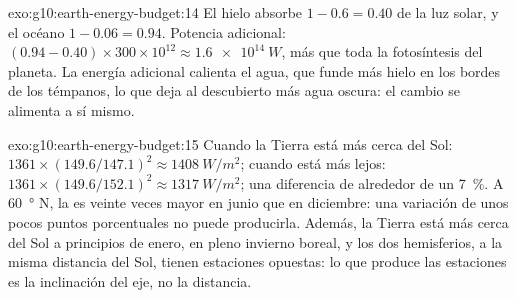 \begin{solution}{exo:g10:earth-energy-budget:14}
El hielo absorbe $1 - 0.6 = 0.40$ de la luz solar, y el océano $1 - 0.06 =
0.94$. Potencia adicional: $(0.94 - 0.40) \times 300 \times 10^{12} \approx
\qty{1.6e14}{W}$, más que toda la fotosíntesis del planeta. La energía
adicional calienta el agua, que funde más hielo en los bordes de los
témpanos, lo que deja al descubierto más agua oscura: el cambio se alimenta
a sí mismo.
\end{solution}

\begin{solution}{exo:g10:earth-energy-budget:15}
Cuando la Tierra está más cerca del Sol: $1361 \times (149.6/147.1)^2 \approx \qty{1408}{W/m^2}$; cuando está más lejos: $1361 \times (149.6/152.1)^2 \approx \qty{1317}{W/m^2}$; una diferencia de alrededor de un \qty{7}{\percent}. A
\qty{60}{\degree} N, la  es veinte veces mayor en junio que en
diciembre: una variación de unos pocos puntos porcentuales no puede
producirla. Además, la Tierra está más cerca del Sol a principios de enero,
en pleno invierno boreal, y los dos hemisferios, a la misma distancia del
Sol, tienen estaciones opuestas: lo que produce las estaciones es la
inclinación del eje, no la distancia.
\end{solution}

